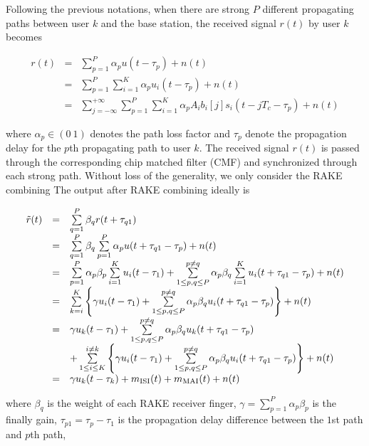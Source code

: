 \documentclass[a4paper,11pt,fleqn]{article}
\begin{document}
Following the previous notations, when there are strong $P$
different propagating paths between user $k$ and the base station,
the received signal $r(t)$ by user $k$ becomes

\begin{equation}
\begin{array}{rcl}
r(t)&=&\sum\limits_{p=1}^{P}\alpha_{p}u(t-\tau_p)+n(t)\\
&=&\sum\limits_{p=1}^{P}\sum\limits_{i=1}^{K}\alpha_{p}u_i(t-\tau_p)+n(t)\\
&=&\sum\limits_{j=-\infty}^{+\infty}\sum\limits_{p=1}^{P}\sum\limits_{i=1}^{K}\alpha_{p}A_i
b_i[j]s_i(t-jT_c-\tau_p)+ n(t)
\end{array}
\end{equation}

\noindent where $\alpha_p\in(0\ 1)$ denotes the path loss factor
and $\tau_p$ denote the propagation delay for the $p$th
propagating path to user $k$. The received signal $r(t)$ is passed
through the corresponding chip matched filter (CMF) and
synchronized through each strong path. Without loss of the
generality, we only consider the RAKE combining The output after
RAKE combining ideally is

\begin{equation}
\begin{array}{rcl}
\tilde{r}(t)&=&\sum\limits_{q=1}^{P}\beta_{q}r(t+\tau_{q1})\\
&=&\sum\limits_{q=1}^{P}\beta_{q}\sum\limits_{p=1}^{P}\alpha_{p}u(t+\tau_{q1}-\tau_p)+n(t)\\
&=&\sum\limits_{p=1}^{P}\alpha_{p}\beta_{p}\sum\limits_{i=1}^{K}u_i(t-\tau_{1})+\sum\limits^{p\neq q}_{1\leq p,q \leq P}\alpha_{p}\beta_{q}\sum\limits_{i=1}^{K}u_i(t+\tau_{q1}-\tau_p)+n(t)\\
&=&\sum\limits_{k=i}^{K}\left\{\gamma u_i(t-\tau_{1})+\sum\limits^{p\neq q}_{1\leq p,q \leq P}\alpha_{p}\beta_{q}u_i(t+\tau_{q1}-\tau_p)\right\}+n(t)\\
&=&\gamma u_k(t-\tau_{1})+\sum\limits^{p\neq q}_{1\leq p,q \leq P}\alpha_{p}\beta_{q}u_k(t+\tau_{q1}-\tau_p)\\
&&+\sum\limits^{i\neq k}_{1\leq i\leq K}\left\{\gamma
u_i(t-\tau_{1})+\sum\limits^{p\neq q}_{1\leq p,q \leq P}\alpha_{p}\beta_{q}u_i(t+\tau_{q1}-\tau_p)\right\}+n(t)\\
&=&\gamma u_k(t-\tau_{k}) + m_{\rm ISI}(t) + m_{\rm MAI}(t) + n(t)
\end{array}
\end{equation}

\noindent where $\beta_q$ is the weight of each RAKE receiver
finger, $\gamma=\sum\limits_{p=1}^{P}\alpha_{p}\beta_{p}$ is the
finally gain, $\tau_{p1} = \tau_{p}-\tau_1$ is the propagation
delay difference between the $1$st path and $p$th path,
\end{document}
